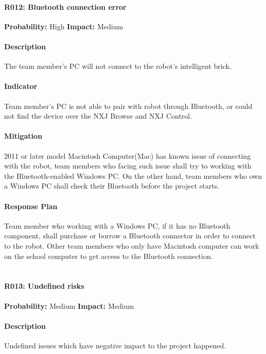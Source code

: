 \documentclass[11pt, a4paper]{report}
\begin{document}
	\paragraph{R012: Bluetooth connection error} \hspace{1cm} \textbf{Probability: }High\hspace{1cm}   \textbf{Impact: }Medium
	\paragraph{Description}The team member's PC will not connect to the robot's intelligent brick.
	\paragraph{Indicator}Team member's PC is not able to pair with robot through Bluetooth, or could not find the device over the NXJ Browse and NXJ Control. 
	\paragraph{Mitigation}2011 or later model Macintosh Computer(Mac) has known issue of connecting with the robot, team members who facing such issue shall try to working with the Bluetooth-enabled Windows PC. On the other hand, team members who own a Windows PC shall check their Bluetooth before the project starts. 
	\paragraph{Response Plan}Team member who working with a Windows PC, if it has no Bluetooth component, shall purchase or borrow a Bluetooth connector in order to connect to the robot. Other team members who only have Macintosh computer can work on the school computer to get access to the Bluetooth connection.\\\\


	\paragraph{R013: Undefined risks} \hspace{1cm} \textbf{Probability: }Medium\hspace{1cm}   \textbf{Impact: }Medium
	\paragraph{Description}Undefined issues which have negative impact to the project happened.
\end{document}
